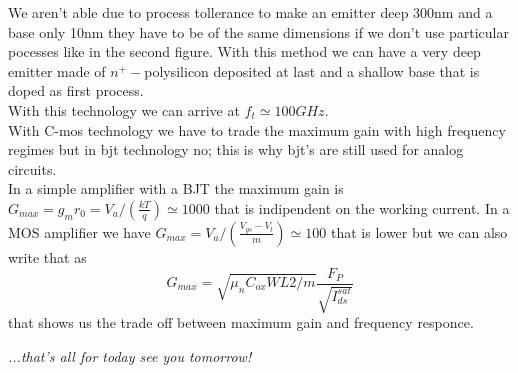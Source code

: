 We aren't able due to process tollerance to make an emitter deep 300nm and a base only 10nm they have to be of the same dimensions if we don't use particular pocesses like in the second figure. With this method we can have a very deep emitter made of $n^+-$polysilicon deposited at last and a shallow base that is doped as first process.\\
With this technology we can arrive at $f_t\simeq 100GHz$.\\

\vspace{5mm}
With C-mos technology we have to trade the maximum gain with high frequency regimes but in bjt technology no; this is why bjt's are still used for analog circuits.\\
In a simple amplifier with a BJT the maximum gain is $G_{max}=g_m r_0=V_a/(\frac{kT}{q})\simeq 1000$ that is indipendent on the working current. In a MOS amplifier we have $G_{max}=V_a/\left(\frac{V_{gs}-V_t}{m}\right)\simeq100$ that is lower but we can also write that as 
\begin{equation}
G_{max}=\sqrt{\mu_nC_{ox}WL2/m}\frac{F_P}{\sqrt{I_{ds}^{sat}}}
\end{equation}
that shows us the trade off between maximum gain and frequency responce.


\vspace{10mm}
\raggedleft
{\it ...that's all for today see you tomorrow!}
